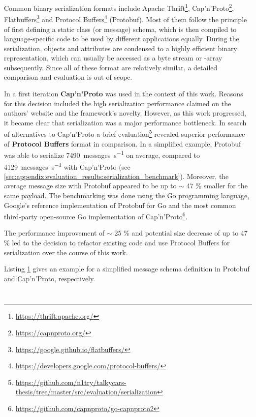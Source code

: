 Common binary serialization formats include Apache Thrift\footnote{\url{https://thrift.apache.org/}}, Cap'n'Proto\footnote{\url{https://capnproto.org/}},  Flatbuffers\footnote{\url{https://google.github.io/flatbuffers/}} and Protocol Buffers\footnote{\url{https://developers.google.com/protocol-buffers/}} (Protobuf). Most of them follow the principle of first defining a static class (or message) schema, which is then compiled to language-specific code to be used by different applications equally. During the serialization, objects and attributes are condensed to a highly efficient binary representation, which can usually be accessed as a byte stream or -array subsequently. Since all of these format are relatively similar, a detailed comparison and evaluation is out of scope.

In a first iteration \textbf{Cap'n'Proto} was used in the context of this work. Reasons for this decision included the high serialization performance claimed on the authors' website and the framework's novelty. However, as this work progressed, it became clear that serialization was a major performance bottleneck. In search of alternatives to Cap'n'Proto a brief evaluation\footnote{\url{https://github.com/n1try/talkycars-thesis/tree/master/src/evaluation/serialization}} revealed superior performance of \textbf{Protocol Buffers} format in comparison. In a simplified example, Protobuf was able to serialize \SI{7490}{messages\per\second} on average, compared to \SI{4129}{messages\per\second} with Cap'n'Proto (see \autoref{sec:appendix:evaluation_results:serialization_benchmark}). Moreover, the average message size with Protobuf appeared to be up to $\sim$ 47 \% smaller for the same payload. The benchmarking was done using the Go programming language, Google's reference implementation of Protobuf for Go and the most common third-party open-source Go implementation of Cap'n'Proto\footnote{\url{https://github.com/capnproto/go-capnproto2}}. 

The performance improvement of $\sim$ 25 \% and potential size decrease of up to 47 \% led to the decision to refactor existing code and use Protocol Buffers for serialization over the course of this work.

Listing \ref{lst:serialization_schema_examples} gives an example for a simplified message schema definition in Protobuf and Cap'n'Proto, respectively.

\begin{figure}[!h]
	\begin{minipage}{0.5\textwidth}
		\centering
		\inputminted[fontsize=\footnotesize]{text}{97_listings/protobuf_snippet.proto}
	\end{minipage}
	\begin{minipage}{0.5\textwidth}
		\centering
		\inputminted[fontsize=\footnotesize]{text}{97_listings/capnp_snippet.capnp}
	\end{minipage}
	\label{lst:serialization_schema_examples}
\end{figure}

